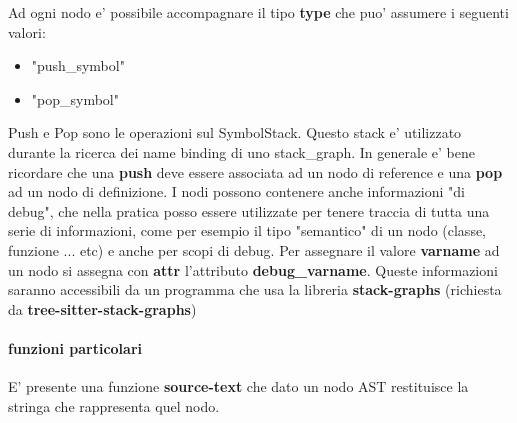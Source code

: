 Ad ogni nodo e' possibile accompagnare il tipo \textbf{type} che puo' assumere i seguenti valori:

\begin{itemize}
  \item "push\_symbol"
  \item "pop\_symbol"
\end{itemize}

Push e Pop sono le operazioni sul SymbolStack. Questo stack e' utilizzato durante la ricerca dei name binding di uno stack\_graph. In generale e' bene ricordare che una \textbf{push} deve essere associata ad un nodo di reference e una \textbf{pop} ad un nodo di definizione.
I nodi possono contenere anche informazioni "di debug", che nella pratica posso essere utilizzate per tenere traccia di tutta una serie di informazioni, come per esempio il tipo "semantico" di un nodo (classe, funzione ... etc) e anche per scopi di debug. Per assegnare il valore \textbf{varname} ad un nodo si assegna con \textbf{attr} l'attributo \textbf{debug\_varname}. Queste informazioni saranno accessibili da un programma che usa la libreria \textbf{stack-graphs} (richiesta da \textbf{tree-sitter-stack-graphs})

\paragraph{funzioni particolari}

E' presente una funzione \textbf{source-text} che dato un nodo AST restituisce la stringa che rappresenta quel nodo.
